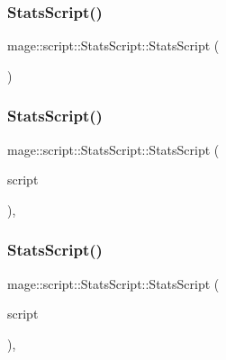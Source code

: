 \subsubsection{\texorpdfstring{Stats\+Script()}{StatsScript()}\hspace{0.1cm}{\footnotesize\ttfamily [1/3]}}
{\footnotesize\ttfamily mage\+::script\+::\+Stats\+Script\+::\+Stats\+Script (\begin{DoxyParamCaption}{ }\end{DoxyParamCaption})}

\hypertarget{classmage_1_1script_1_1_stats_script_a3fb4aa69fc341df0fe2c2ad03f0ff278}{}\label{classmage_1_1script_1_1_stats_script_a3fb4aa69fc341df0fe2c2ad03f0ff278} 
\subsubsection{\texorpdfstring{Stats\+Script()}{StatsScript()}\hspace{0.1cm}{\footnotesize\ttfamily [2/3]}}
{\footnotesize\ttfamily mage\+::script\+::\+Stats\+Script\+::\+Stats\+Script (\begin{DoxyParamCaption}\item[{const \hyperlink{classmage_1_1script_1_1_stats_script}{Stats\+Script} \&}]{script }\end{DoxyParamCaption})\hspace{0.3cm}{\ttfamily [default]}, {\ttfamily [noexcept]}}

\hypertarget{classmage_1_1script_1_1_stats_script_a9ac8ca59744a668504010b0f496f266f}{}\label{classmage_1_1script_1_1_stats_script_a9ac8ca59744a668504010b0f496f266f} 
\subsubsection{\texorpdfstring{Stats\+Script()}{StatsScript()}\hspace{0.1cm}{\footnotesize\ttfamily [3/3]}}
{\footnotesize\ttfamily mage\+::script\+::\+Stats\+Script\+::\+Stats\+Script (\begin{DoxyParamCaption}\item[{\hyperlink{classmage_1_1script_1_1_stats_script}{Stats\+Script} \&\&}]{script }\end{DoxyParamCaption})\hspace{0.3cm}{\ttfamily [default]}, {\ttfamily [noexcept]}}

